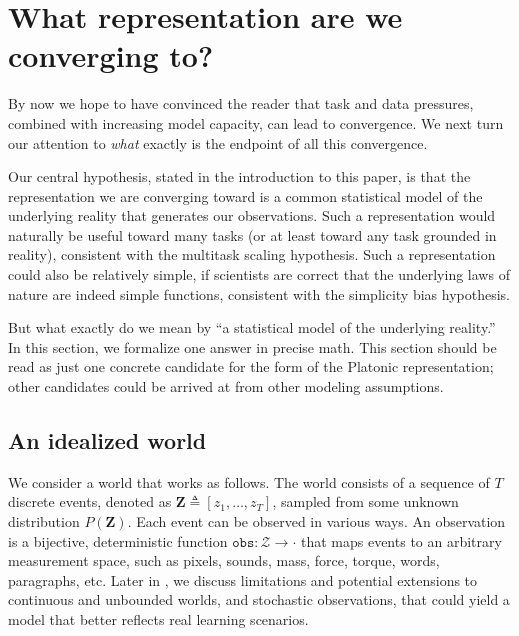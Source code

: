 \section{What representation are we converging to?}


By now we hope to have convinced the reader that task and data pressures, combined with increasing model capacity, can lead to convergence. We next turn our attention to \textit{what} exactly is the endpoint of all this convergence. 

Our central hypothesis, stated in the introduction to this paper, is that the representation we are converging toward is a common statistical model of the underlying reality that generates our observations. Such a representation would naturally be useful toward many tasks (or at least toward any task grounded in reality), consistent with the multitask scaling hypothesis. Such a representation could also be relatively simple, if scientists are correct that the underlying laws of nature are indeed simple functions, consistent with the simplicity bias hypothesis.

But what exactly do we mean by ``a statistical model of the underlying reality.'' In this section, we formalize one answer in precise math. This section should be read as just one concrete candidate for the form of the Platonic representation; other candidates could be arrived at from other modeling assumptions.

\subsection{An idealized world}
We consider a world that works as follows. The world consists of a sequence of $T$ discrete events, denoted as $\mathbf{Z} \triangleq [z_1, \ldots, z_T]$, sampled from some unknown distribution $P(\mathbf{Z})$. Each event can be observed in various ways. An observation is a bijective, deterministic function $\texttt{obs}: \mathcal{Z} \rightarrow \cdot$ that maps events to an arbitrary measurement space, such as pixels, sounds, mass, force, torque, words, paragraphs, etc. 
Later in , we discuss limitations and potential extensions to continuous and unbounded worlds, and stochastic observations, that could yield a model that better reflects real learning scenarios.

